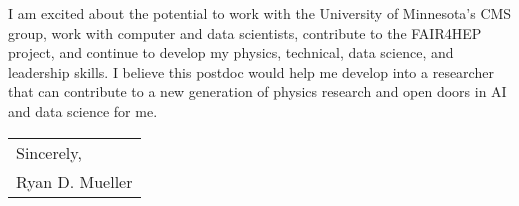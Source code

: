 \documentclass[11pt]{article}
\begin{document}
I am excited about the potential to work with the University of Minnesota's CMS group, work with computer and data scientists, contribute to the FAIR4HEP project, and continue to develop my physics, technical, data science, and leadership skills. I believe this postdoc would help me develop into a researcher that can contribute to a new generation of physics research and open doors in AI and data science for me. 



\bigskip

\begin{tabular}{@{}l@{}}
Sincerely, \\
  [.4em]
  Ryan D. Mueller
\end{tabular}


\medskip

\printbibliography
\end{document}
